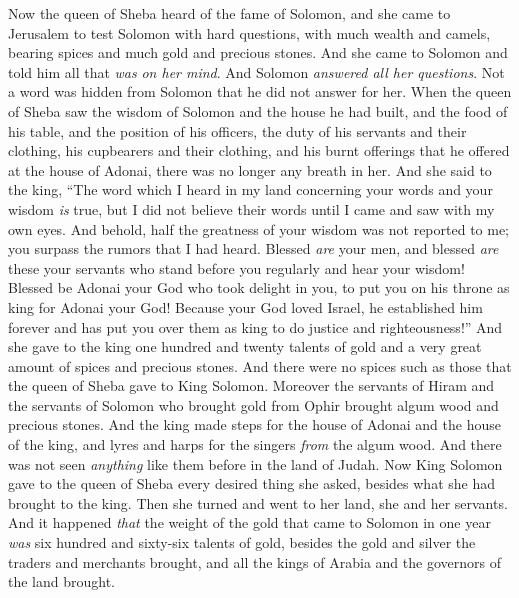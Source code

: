 \begin{biblechapter} %
 Now the queen of Sheba heard of the fame of Solomon, and she came to Jerusalem to test Solomon with hard questions, with much wealth and camels, bearing spices and much gold and precious stones. And she came to Solomon and told him all that \textit{was} \textit{on her mind}.
\verse And Solomon \textit{answered all her questions}. Not a word was hidden from Solomon that he did not answer for her.
\verse When the queen of Sheba saw the wisdom of Solomon and the house he had built,
\verse and the food of his table, and the position of his officers, the duty of his servants and their clothing, his cupbearers and their clothing, and his burnt offerings that he offered at the house of Adonai, there was no longer any breath in her.
\verse And she said to the king, “The word which I heard in my land concerning your words and your wisdom \textit{is} true,
\verse but I did not believe their words until I came and saw with my own eyes. And behold, half the greatness of your wisdom was not reported to me; you surpass the rumors that I had heard.
\verse Blessed \textit{are} your men, and blessed \textit{are} these your servants who stand before you regularly and hear your wisdom!
\verse Blessed be Adonai your God who took delight in you, to put you on his throne as king for Adonai your God! Because your God loved Israel, he established him forever and has put you over them as king to do justice and righteousness!”
\verse And she gave to the king one hundred and twenty talents of gold and a very great amount of spices and precious stones. And there were no spices such as those that the queen of Sheba gave to King Solomon.
\verse Moreover the servants of Hiram and the servants of Solomon who brought gold from Ophir brought algum wood and precious stones.
\verse And the king made steps for the house of Adonai and the house of the king, and lyres and harps for the singers \textit{from} the algum wood. And there was not seen \textit{anything} like them before in the land of Judah.
\verse Now King Solomon gave to the queen of Sheba every desired thing she asked, besides what she had brought to the king. Then she turned and went to her land, she and her servants.
 And it happened \textit{that} the weight of the gold that came to Solomon in one year \textit{was} six hundred and sixty-six talents of gold,
\verse besides the gold and silver the traders and merchants brought, and all the kings of Arabia and the governors of the land brought.

\end{biblechapter}
